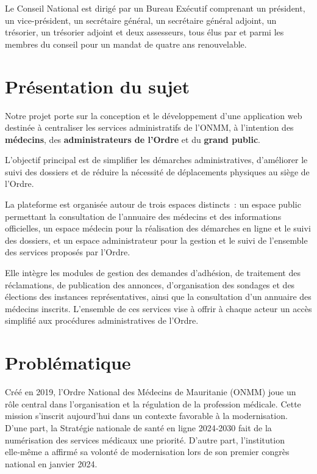 ﻿\documentclass[12pt,a4paper]{report}
\begin{document}
Le Conseil National est dirigé par un Bureau Exécutif comprenant un président,
un vice-président, un secrétaire général, un secrétaire général adjoint, un
trésorier, un trésorier adjoint et deux assesseurs, tous élus par et parmi
les membres du conseil pour un mandat de quatre ans renouvelable.

\section{Présentation du sujet}

Notre projet porte sur la conception et le développement d'une application
web destinée à centraliser les services administratifs de l'ONMM, à
l'intention des \textbf{médecins}, des \textbf{administrateurs de l'Ordre}
et du \textbf{grand public}.

L'objectif principal est de simplifier les démarches administratives,
d'améliorer le suivi des dossiers et de réduire la nécessité de
déplacements physiques au siège de l'Ordre.

La plateforme est organisée autour de trois espaces distincts~: un espace
public permettant la consultation de l'annuaire des médecins et des
informations officielles, un espace médecin pour la réalisation des
démarches en ligne et le suivi des dossiers, et un espace administrateur
pour la gestion et le suivi de l'ensemble des services proposés par
l'Ordre.

Elle intègre les modules de gestion des demandes d'adhésion, de traitement
des réclamations, de publication des annonces, d'organisation des sondages
et des élections des instances représentatives, ainsi que la consultation
d'un annuaire des médecins inscrits. L'ensemble de ces services vise à
offrir à chaque acteur un accès simplifié aux procédures administratives
de l'Ordre.


\section{Problématique}

Créé en 2019, l’Ordre National des Médecins de Mauritanie (ONMM) joue un rôle central dans l’organisation et la régulation de la profession médicale. Cette mission s’inscrit aujourd’hui dans un contexte favorable à la modernisation. D’une part, la Stratégie nationale de santé en ligne 2024‑2030 fait de la numérisation des services médicaux une priorité. D’autre part, l’institution elle‑même a affirmé sa volonté de modernisation lors de son premier congrès national en janvier 2024.
\end{document}
